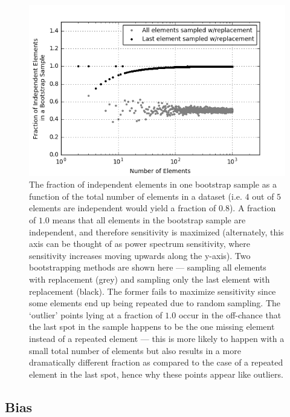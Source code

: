 \documentclass[preprint2,numberedappendix,tighten]{aastex6}  %
\begin{document}
\begin{figure}
	\centering
	\includegraphics[trim={0.3cm 0.3cm 0.3cm 0.3cm},width=\columnwidth]{plots/toy_error2.png}
	\caption{The fraction of independent elements in one bootstrap sample as a function of the total number of elements in a dataset (i.e. $4$ out of $5$ elements are independent would yield a fraction of $0.8$). A fraction of $1.0$ means that all elements in the bootstrap sample are independent, and therefore sensitivity is maximized (alternately, this axis can be thought of as power spectrum sensitivity, where sensitivity increases moving upwards along the y-axis). Two bootstrapping methods are shown here --- sampling all elements with replacement (grey) and sampling only the last element with replacement (black). The former fails to maximize sensitivity since some elements end up being repeated due to random sampling. The `outlier' points lying at a fraction of $1.0$ occur in the off-chance that the last spot in the sample happens to be the one missing element instead of a repeated element --- this is more likely to happen with a small total number of elements but also results in a more dramatically different fraction as compared to the case of a repeated element in the last spot, hence why these points appear like outliers.}
	\label{fig:toy_error2}
\end{figure}


\subsection{Bias}
\label{sec:BiasOverview}
\end{document}
